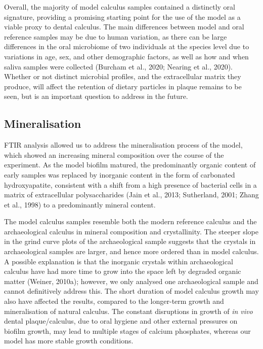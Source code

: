 \documentclass[
]{article}
\begin{document}
Overall, the majority of model calculus samples contained a distinctly
oral signature, providing a promising starting point for the use of the
model as a viable proxy to dental calculus. The main differences between
model and oral reference samples may be due to human variation, as there
can be large differences in the oral microbiome of two individuals at
the species level due to variations in age, sex, and other demographic
factors, as well as how and when saliva samples were collected (Burcham
et al., 2020; Nearing et al., 2020). Whether or not distinct microbial
profiles, and the extracellular matrix they produce, will affect the
retention of dietary particles in plaque remains to be seen, but is an
important question to address in the future.

\hypertarget{mineralisation}{%
\subsection{Mineralisation}\label{mineralisation}}

FTIR analysis allowed us to address the mineralisation process of the
model, which showed an increasing mineral composition over the course of
the experiment. As the model biofilm matured, the predominantly organic
content of early samples was replaced by inorganic content in the form
of carbonated hydroxyapatite, consistent with a shift from a high
presence of bacterial cells in a matrix of extracellular polysaccharides
(Jain et al., 2013; Sutherland, 2001; Zhang et al., 1998) to a
predominantly mineral content.

The model calculus samples resemble both the modern reference calculus
and the archaeological calculus in mineral composition and
crystallinity. The steeper slope in the grind curve plots of the
archaeological sample suggests that the crystals in archaeological
samples are larger, and hence more ordered than in model calculus. A
possible explanation is that the inorganic crystals within
archaeological calculus have had more time to grow into the space left
by degraded organic matter (Weiner, 2010a); however, we only analysed
one archaeological sample and cannot definitively address this. The
short duration of model calculus growth may also have affected the
results, compared to the longer-term growth and mineralisation of
natural calculus. The constant disruptions in growth of \emph{in vivo}
dental plaque/calculus, due to oral hygiene and other external pressures
on biofilm growth, may lead to multiple stages of calcium phosphates,
whereas our model has more stable growth conditions.
\end{document}
